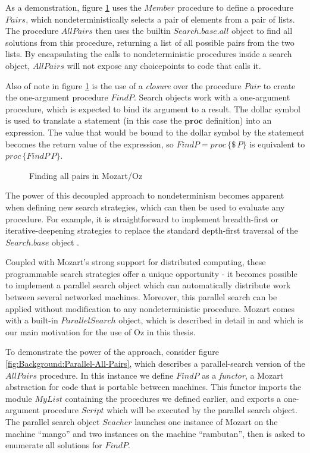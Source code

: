 As a demonstration, figure \ref{fig:Background:All-Pairs} uses the
$Member$ procedure to define a procedure $Pairs$, which nondeterministically
selects a pair of elements from a pair of lists. The procedure $AllPairs$
then uses the builtin $Search.base.all$ object to find all solutions
from this procedure, returning a list of all possible pairs from the
two lists. By encapsulating the calls to nondeterministic procedures
inside a search object, $AllPairs$ will not expose any choicepoints
to code that calls it.

Also of note in figure \ref{fig:Background:All-Pairs} is the use
of a \emph{closure} over the procedure $Pair$ to create the one-argument
procedure $FindP$. Search objects work with a one-argument procedure,
which is expected to bind its argument to a result. The dollar symbol
is used to translate a statement (in this case the $\mathbf{proc}$
definition) into an expression. The value that would be bound to the
dollar symbol by the statement becomes the return value of the expression,
so $FindP=proc\,\{\$\, P\}$ is equivalent to $proc\,\{FindP\, P\}$.

%
\begin{figure}[t]

\caption{Finding all pairs in Mozart/Oz\label{fig:Background:All-Pairs}}

\end{figure}


The power of this decoupled approach to nondeterminism becomes apparent
when defining new search strategies, which can then be used to evaluate
any procedure. For example, it is straightforward to implement breadth-first
or iterative-deepening strategies to replace the standard depth-first
traversal of the $Search.base$ object \citep{schulte00constraint_services}.

Coupled with Mozart's strong support for distributed computing, these
programmable search strategies offer a unique opportunity - it becomes
possible to implement a parallel search object which can automatically
distribute work between several networked machines. Moreover, this
parallel search can be applied without modification to any nondeterministic
procedure. Mozart comes with a built-in $ParallelSearch$ object,
which is described in detail in \citep{schulte00oz_parallel} and
which is our main motivation for the use of Oz in this thesis.

To demonstrate the power of the approach, consider figure \ref{fig:Background:Parallel-All-Pairs},
which describes a parallel-search version of the $AllPairs$ procedure.
In this instance we define $FindP$ as a \emph{functor}, a Mozart
abstraction for code that is portable between machines. This functor
imports the module $MyList$ containing the procedures we defined
earlier, and exports a one-argument procedure $Script$ which will
be executed by the parallel search object. The parallel search object
$Seacher$ launches one instance of Mozart on the machine {}``mango''
and two instances on the machine {}``rambutan'', then is asked to
enumerate all solutions for $FindP$.


